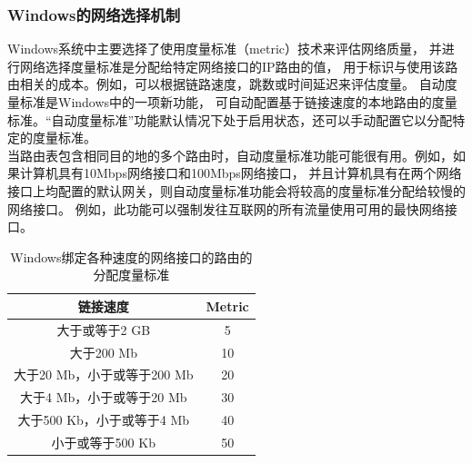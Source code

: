 \documentclass[11pt]{article}
\begin{document}
\subsubsection{Windows的网络选择机制}
Windows系统中主要选择了使用度量标准（metric）技术来评估网络质量，
并进行网络选择度量标准是分配给特定网络接口的IP路由的值，
用于标识与使用该路由相关的成本。例如，可以根据链路速度，跳数或时间延迟来评估度量。
自动度量标准是Windows中的一项新功能，
可自动配置基于链接速度的本地路由的度量标准。“自动度量标准”功能默认情况下处于启用状态，还可以手动配置它以分配特定的度量标准。
\\
当路由表包含相同目的地的多个路由时，自动度量标准功能可能很有用。例如，如果计算机具有10Mbps网络接口和100Mbps网络接口，
并且计算机具有在两个网络接口上均配置的默认网关，则自动度量标准功能会将较高的度量标准分配给较慢的网络接口。
例如，此功能可以强制发往互联网的所有流量使用可用的最快网络接口。
\begin{table}[H]
    \begin{center}
    \begin{tabular}{cc}
        \toprule
        链接速度 & Metric\\
        \midrule
        大于或等于2 GB & 5  \\
        大于200 Mb & 10  \\
        大于20 Mb，小于或等于200 Mb & 20 \\
        大于4 Mb，小于或等于20 Mb & 30 \\
        大于500 Kb，小于或等于4 Mb & 40 \\
        小于或等于500 Kb & 50 \\
        \bottomrule
    \end{tabular}
    \caption{Windows绑定各种速度的网络接口的路由的分配度量标准}
    \end{center}
\end{table}
\end{document}
